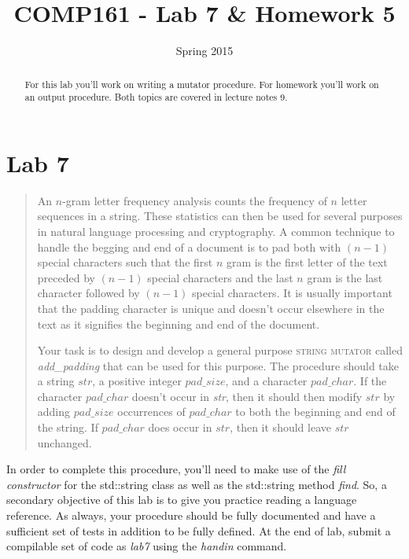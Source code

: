\documentclass[]{tufte-handout}
\title{COMP161 - Lab 7 \& Homework 5}
\author{}
\date{Spring 2015}
\begin{document}
\maketitle

\begin{abstract}
For this lab you'll work on writing a mutator procedure. For homework you'll work on an output procedure. Both topics are covered in lecture notes 9. 
\end{abstract}

\section{Lab 7}

\begin{framed}
\begin{quote}
An $n$-gram letter frequency analysis counts the frequency of $n$ letter sequences in a string. These statistics can then be used for several purposes in natural language processing and cryptography. A common technique to handle the begging and end of a document is to pad both with $(n-1)$ special characters such that the first $n$ gram is the first letter of the text preceded by $(n-1)	$ special characters and the last $n$ gram is the last character followed by $(n-1)$ special characters. It is usually important that the padding character is unique and doesn't occur elsewhere in the text as it signifies the beginning and end of the document. 

Your task is to design and develop a general purpose \textsc{string mutator} called \textit{add\_padding} that can be used for this purpose. The procedure should take a string $str$, a positive integer $pad\_size$, and a character $pad\_char$. If the character $pad\_char$ doesn't occur in \textit{str}, then it should then modify $str$ by adding  $pad\_size$ occurrences of $pad\_char$ to both the beginning and end of the string. If $pad\_char$ does occur in $str$, then it should leave $str$ unchanged.
\end{quote}
\end{framed}

In order to complete this procedure, you'll need to make use of the \textit{fill constructor} for the std::string class as well as the std::string method \textit{find}.  So, a secondary objective of this lab is to give you practice reading a language reference.  As always, your procedure should be fully documented and have a sufficient set of tests in addition to be fully defined. At the end of lab, submit a compilable set of code as \textit{lab7} using the \textit{handin} command.  
\end{document}

